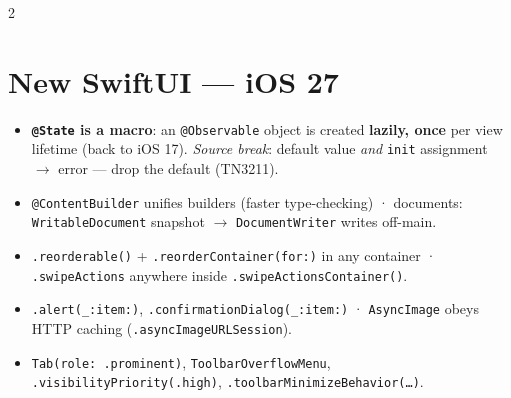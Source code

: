 \documentclass[8pt]{extarticle}
\begin{document}
\begin{multicols}{2}
\section{New SwiftUI — iOS 27}
\begin{itemize}
  \item \textbf{\texttt{@State} is a macro}: an \texttt{@Observable} object is created
        \textbf{lazily, once} per view lifetime (back to iOS 17). \emph{Source break}: default
        value \emph{and} \texttt{init} assignment $\to$ error — drop the default (TN3211).
  \item \texttt{@ContentBuilder} unifies builders (faster type-checking) · documents:
        \texttt{WritableDocument} snapshot $\to$ \texttt{DocumentWriter} writes off-main.
  \item \texttt{.reorderable()} + \texttt{.reorderContainer(for:)} in any container ·
        \texttt{.swipeActions} anywhere inside \texttt{.swipeActionsContainer()}.
  \item \texttt{.alert(\_:item:)}, \texttt{.confirmationDialog(\_:item:)} · \texttt{AsyncImage}
        obeys HTTP caching (\texttt{.asyncImageURLSession}).
  \item \texttt{Tab(role: .prominent)}, \texttt{ToolbarOverflowMenu},
        \texttt{.visibilityPriority(.high)}, \texttt{.toolbarMinimizeBehavior(\ldots)}.
\end{itemize}


\end{multicols}

\end{document}
